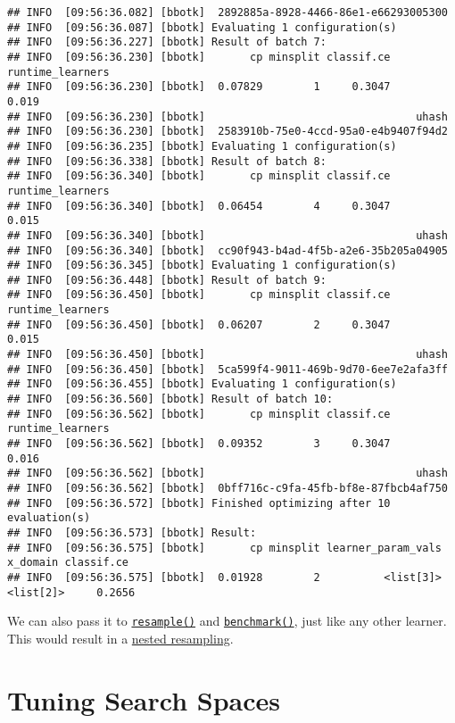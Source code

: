 \documentclass[
]{scrbook}
\begin{document}
\begin{verbatim}
## INFO  [09:56:36.082] [bbotk]  2892885a-8928-4466-86e1-e66293005300 
## INFO  [09:56:36.087] [bbotk] Evaluating 1 configuration(s) 
## INFO  [09:56:36.227] [bbotk] Result of batch 7: 
## INFO  [09:56:36.230] [bbotk]       cp minsplit classif.ce runtime_learners 
## INFO  [09:56:36.230] [bbotk]  0.07829        1     0.3047            0.019 
## INFO  [09:56:36.230] [bbotk]                                 uhash 
## INFO  [09:56:36.230] [bbotk]  2583910b-75e0-4ccd-95a0-e4b9407f94d2 
## INFO  [09:56:36.235] [bbotk] Evaluating 1 configuration(s) 
## INFO  [09:56:36.338] [bbotk] Result of batch 8: 
## INFO  [09:56:36.340] [bbotk]       cp minsplit classif.ce runtime_learners 
## INFO  [09:56:36.340] [bbotk]  0.06454        4     0.3047            0.015 
## INFO  [09:56:36.340] [bbotk]                                 uhash 
## INFO  [09:56:36.340] [bbotk]  cc90f943-b4ad-4f5b-a2e6-35b205a04905 
## INFO  [09:56:36.345] [bbotk] Evaluating 1 configuration(s) 
## INFO  [09:56:36.448] [bbotk] Result of batch 9: 
## INFO  [09:56:36.450] [bbotk]       cp minsplit classif.ce runtime_learners 
## INFO  [09:56:36.450] [bbotk]  0.06207        2     0.3047            0.015 
## INFO  [09:56:36.450] [bbotk]                                 uhash 
## INFO  [09:56:36.450] [bbotk]  5ca599f4-9011-469b-9d70-6ee7e2afa3ff 
## INFO  [09:56:36.455] [bbotk] Evaluating 1 configuration(s) 
## INFO  [09:56:36.560] [bbotk] Result of batch 10: 
## INFO  [09:56:36.562] [bbotk]       cp minsplit classif.ce runtime_learners 
## INFO  [09:56:36.562] [bbotk]  0.09352        3     0.3047            0.016 
## INFO  [09:56:36.562] [bbotk]                                 uhash 
## INFO  [09:56:36.562] [bbotk]  0bff716c-c9fa-45fb-bf8e-87fbcb4af750 
## INFO  [09:56:36.572] [bbotk] Finished optimizing after 10 evaluation(s) 
## INFO  [09:56:36.573] [bbotk] Result: 
## INFO  [09:56:36.575] [bbotk]       cp minsplit learner_param_vals  x_domain classif.ce 
## INFO  [09:56:36.575] [bbotk]  0.01928        2          <list[3]> <list[2]>     0.2656
\end{verbatim}

We can also pass it to \href{https://mlr3.mlr-org.com/reference/resample.html}{\texttt{resample()}} and \href{https://mlr3.mlr-org.com/reference/benchmark.html}{\texttt{benchmark()}}, just like any other learner. This would result in a \protect\hyperlink{nested-resampling}{nested resampling}.

\hypertarget{searchspace}{%
\section{Tuning Search Spaces}\label{searchspace}}
\end{document}
